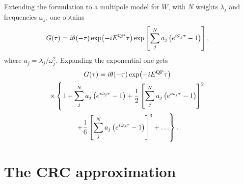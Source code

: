 \documentclass[a4paper,12pt]{article}
\def\be{\begin{equation}}
\def\ee{\end{equation}}
\begin{document}
Extending the formulation to a multipole model for $W$, with $N$ weights $\lambda_j$ and frequencies $\omega_j$, one obtains 
\be
   {G} ( \tau ) =  i \theta ( -\tau ) 
  \exp\! \left( - i E^\textnormal{QP} \tau \right)
  \exp\left[ \sum_j^N a_j \left(  e^{i\tilde\omega_j \tau } - 1 
      \right)  \right] ,
\ee
where $ a_j = \lambda_j/\omega_j^2 $. 
Expanding the exponential one gets
\begin{multline}
   {G} ( \tau ) =  i \theta ( -\tau ) 
  \exp\! \left( - i E^\textnormal{QP} \tau \right) \\
 \times \left\{ 1 + 
    \sum_j^N a_j \left(  e^{i\tilde\omega_j \tau } - 1  \right) 
  + \frac12 \left[ \sum_j^N a_j \left(  e^{i\tilde\omega_j \tau } - 1  \right)  \right]^2  \right. \\
  \left.  + \frac16  \left[ \sum_j^N a_j \left(  e^{i\tilde\omega_j \tau } - 1  \right)  \right]^3  
  + \ldots  \right\} .
\end{multline}


\section{The CRC approximation}
\end{document}
